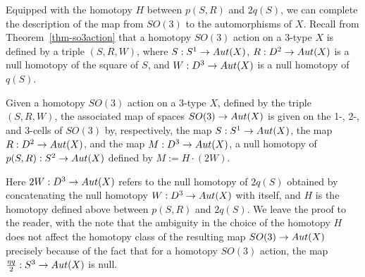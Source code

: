\documentclass{amsart}
\begin{document}
Equipped with the homotopy $H$ between $p(S,R)$ and $2 q(S)$, we can complete the description of the map from $SO(3)$ to the automorphisms of $X$.  Recall from Theorem~\ref{thm-so3action} that a homotopy $SO(3)$ action on a 3-type $X$ is defined by a triple $(S,R,W)$, where $S: S^1 \rightarrow Aut(X)$, $R: D^2 \rightarrow Aut(X)$ is a null homotopy of the square of $S$, and $W: D^3 \rightarrow Aut(X)$ is a null homotopy of $q(S)$.
\begin{proposition} \label{prop-so3map}
Given a homotopy $SO(3)$ action on a 3-type $X$, defined by the triple $(S,R,W)$, the associated map of spaces $SO(3) \rightarrow Aut(X)$ is given on the 1-, 2-, and 3-cells of $SO(3)$ by, respectively, the map $S: S^1 \rightarrow Aut(X)$, the map $R: D^2 \rightarrow Aut(X)$, and the map $M: D^3 \rightarrow Aut(X)$, a null homotopy of $p(S,R): S^2 \rightarrow Aut(X)$ defined by $M:=H \cdot (2 W)$.
\end{proposition}
\nid Here $2 W: D^3 \rightarrow Aut(X)$ refers to the null homotopy of $2 q(S)$ obtained by concatenating the null homotopy $W: D^3 \rightarrow Aut(X)$ with itself, and $H$ is the homotopy defined above between $p(S,R)$ and $2 q(S)$.  We leave the proof to the reader, with the note that the ambiguity in the choice of the homotopy $H$ does not affect the homotopy class of the resulting map $SO(3) \rightarrow Aut(X)$ precisely because of the fact that for a homotopy $SO(3)$ action, the map $\frac{\eta q}{2}: S^3 \rightarrow Aut(X)$ is null. 
\end{document}
